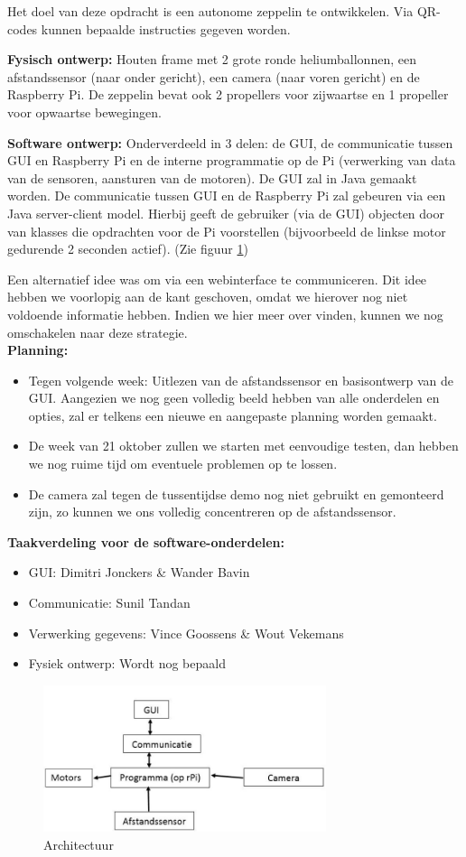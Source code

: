 \documentclass{peno-opdracht1}
\begin{document}
\maketitle

Het doel van deze opdracht is een autonome zeppelin te ontwikkelen. Via QR-codes kunnen bepaalde instructies gegeven worden.

\textbf{Fysisch ontwerp:} Houten frame met 2 grote ronde heliumballonnen, een afstandssensor (naar onder gericht), een camera (naar voren gericht) en de Raspberry Pi. De zeppelin bevat ook 2 propellers voor zijwaartse en 1 propeller voor opwaartse bewegingen.

\textbf{Software ontwerp:} Onderverdeeld in 3 delen: de GUI, de communicatie tussen GUI en Raspberry Pi en de interne programmatie op de Pi (verwerking van data van de sensoren, aansturen van de motoren).
De GUI zal in Java gemaakt worden. De communicatie tussen GUI en de Raspberry Pi zal gebeuren via een Java server-client model. Hierbij geeft de gebruiker (via de GUI) objecten door van klasses die opdrachten voor de Pi voorstellen (bijvoorbeeld de linkse motor gedurende 2 seconden actief). (Zie figuur \ref{schema})

Een alternatief idee was om via een webinterface te communiceren. Dit idee hebben we voorlopig aan de kant geschoven, omdat we hierover nog niet voldoende informatie hebben. Indien we hier meer over vinden, kunnen we nog omschakelen naar deze strategie.\\

\textbf{Planning:}
\begin{itemize}
\item Tegen volgende week: Uitlezen van de afstandssensor en basisontwerp van de GUI. Aangezien we nog geen volledig beeld hebben van alle onderdelen en opties, zal er telkens een nieuwe en aangepaste planning worden gemaakt.
\item De week van 21 oktober zullen we starten met eenvoudige testen, dan hebben we nog ruime tijd om eventuele problemen op te lossen.
\item De camera zal tegen de tussentijdse demo nog niet gebruikt en gemonteerd zijn, zo kunnen we ons volledig concentreren op de afstandssensor.
\end{itemize}


\textbf{Taakverdeling voor de software-onderdelen:}
\begin{itemize}
\item GUI: Dimitri Jonckers \& Wander Bavin
\item Communicatie: Sunil Tandan
\item Verwerking gegevens: Vince Goossens \& Wout Vekemans
\item Fysiek ontwerp: Wordt nog bepaald
\end{itemize}

\begin{figure}[ht!]
\centering
\includegraphics[height=43mm]{Schema.jpg}
\caption{Architectuur}
\label{schema}
\end{figure}
\end{document}
